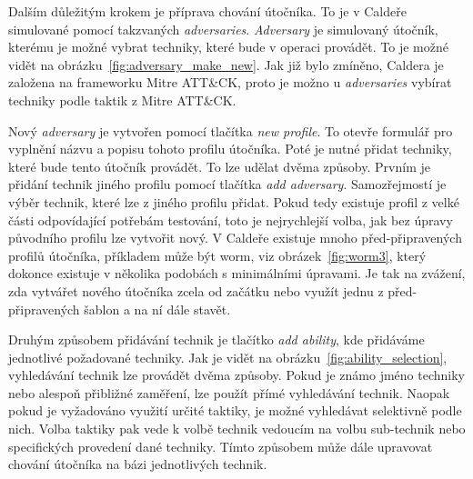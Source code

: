 
Dalším důležitým krokem je příprava chování útočníka.
To je v Caldeře simulované pomocí takzvaných \textit{adversaries}.
\textit{Adversary} je simulovaný útočník, kterému je možné vybrat techniky, které bude v operaci provádět.
To je možné vidět na obrázku~\ref{fig:adversary_make_new}.
Jak již bylo zmíněno, Caldera je založena na frameworku Mitre ATT\&CK, proto je možno u \textit{adversaries} vybírat techniky podle taktik z Mitre ATT\&CK\@.


Nový \textit{adversary} je vytvořen pomocí tlačítka \textit{new profile}.
To otevře formulář pro vyplnění názvu a popisu tohoto profilu útočníka.
Poté je nutné přidat techniky, které bude tento útočník provádět.
To lze udělat dvěma způsoby.
Prvním je přidání technik jiného profilu pomocí tlačítka \textit{add adversary}.
Samozřejmostí je výběr technik, které lze z jiného profilu přidat.
Pokud tedy existuje profil z velké části odpovídající potřebám testování, toto je nejrychlejší volba, jak bez úpravy původního profilu lze vytvořit nový.
V Caldeře existuje mnoho před-připravených profilů útočníka, příkladem může být worm, viz obrázek~\ref{fig:worm3}, který dokonce existuje v několika podobách s minimálními úpravami.
Je tak na zvážení, zda vytvářet nového útočníka zcela od začátku nebo využít jednu z před-připravených šablon a na ní dále stavět.


Druhým způsobem přidávání technik je tlačítko \textit{add ability}, kde přidáváme jednotlivé požadované techniky.
Jak je vidět na obrázku~\ref{fig:ability_selection}, vyhledávání technik lze provádět dvěma způsoby.
Pokud je známo jméno techniky nebo alespoň přibližné zaměření, lze použít přímé vyhledávání technik.
Naopak pokud je vyžadováno využití určité taktiky, je možné vyhledávat selektivně podle nich.
Volba taktiky pak vede k volbě technik vedoucím na volbu sub-technik nebo specifických provedení dané techniky.
Tímto způsobem může dále upravovat chování útočníka na bázi jednotlivých technik.


